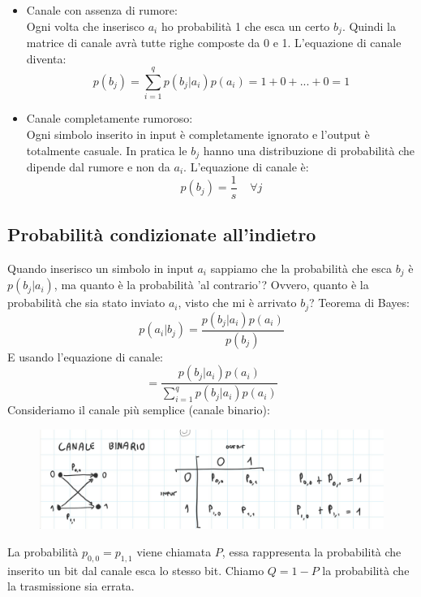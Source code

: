 \begin{itemize}
	\item Canale con assenza di rumore:\\
	Ogni volta che inserisco $a_i$ ho probabilità 1 che esca un certo $b_j$. Quindi la matrice di canale avrà tutte righe composte da 0 e 1.
	L'equazione di canale diventa:
	\begin{equation*}
	p(b_j) =\sum_{i=1}^qp(b_j|a_i)p(a_i) = 1 + 0 + ... + 0 = 1
	\end{equation*}
	\item Canale completamente rumoroso:\\
	Ogni simbolo inserito in input è completamente ignorato e l'output è totalmente casuale.
	In pratica le $b_j$ hanno una distribuzione di probabilità che dipende dal rumore e non da $a_i$.
	L'equazione di canale è:
	\begin{equation*}
	p(b_j) =\frac{1}{s} \; \; \; \; \forall j
	\end{equation*}
\end{itemize}

\subsection*{Probabilità condizionate all'indietro}
Quando inserisco un simbolo in input $a_i$ sappiamo che la probabilità che esca $b_j$ è $p(b_j|a_i)$, ma quanto è la probabilità 'al contrario'? Ovvero, quanto è la probabilità che sia stato inviato $a_i$, visto che mi è arrivato $b_j$? Teorema di Bayes:
\begin{equation*}
p(a_i|b_j) = \frac{p(b_j|a_i)p(a_i)}{p(b_j)}
\end{equation*}
E usando l'equazione di canale:
\begin{equation*}
= \frac{p(b_j|a_i)p(a_i)}{\sum_{i=1}^qp(b_j|a_i)p(a_i)}
\end{equation*}
Consideriamo il canale più semplice (canale binario):
\begin{figure}[H]
	\centering
	\includegraphics[width=\linewidth]{immagini/img29}
\end{figure}
La probabilità $p_{0,0} = p_{1,1}$ viene chiamata $P$, essa rappresenta la probabilità che inserito un bit dal canale esca lo stesso bit.
Chiamo $Q = 1-P$ la probabilità che la trasmissione sia errata.

